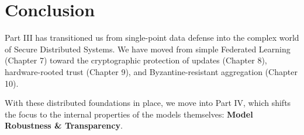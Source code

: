 \section{Conclusion}
\label{sec:conclusion_robustness}

Part III has transitioned us from single-point data defense into the complex world of Secure Distributed Systems. We have moved from simple Federated Learning (Chapter 7) toward the cryptographic protection of updates (Chapter 8), hardware-rooted trust (Chapter 9), and Byzantine-resistant aggregation (Chapter 10). 

With these distributed foundations in place, we move into Part IV, which shifts the focus to the internal properties of the models themselves: \textbf{Model Robustness \& Transparency}.


